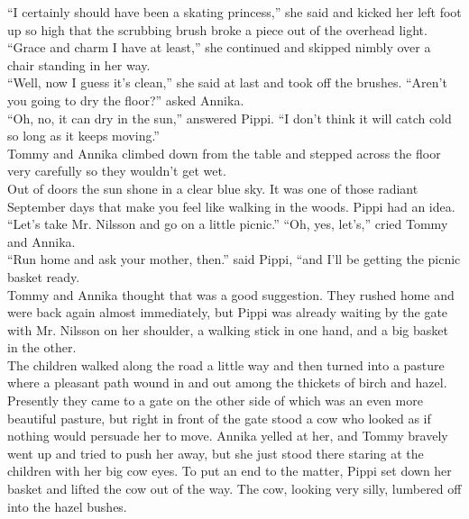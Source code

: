 \documentclass{standard}
\begin{document}
“I certainly should have been a skating princess,” she said and kicked her left foot up so high that the scrubbing brush broke a piece out of the overhead light.\\

“Grace and charm I have at least,” she continued and skipped nimbly over a chair standing in her way.\\

“Well, now I guess it’s clean,” she said at last and took off the brushes. “Aren’t you going to dry the floor?” asked Annika.\\

“Oh, no, it can dry in the sun,” answered Pippi. “I don’t think it will catch cold so long as it keeps moving.”\\

Tommy and Annika climbed down from the table and stepped across the floor very carefully so they wouldn’t get wet.\\

Out of doors the sun shone in a clear blue sky. It was one of those radiant September days that make you feel like walking in the woods. Pippi had an idea.\\

“Let’s take Mr. Nilsson and go on a little picnic.” “Oh, yes, let’s,” cried Tommy and Annika.\\

“Run home and ask your mother, then.” said Pippi, “and I’ll be getting the picnic basket ready.\\

Tommy and Annika thought that was a good suggestion. They rushed home and were back again almost immediately, but Pippi was already waiting by the gate with Mr. Nilsson on her shoulder, a walking stick in one hand, and a big basket in the other.\\

The children walked along the road a little way and then turned into a pasture where a pleasant path wound in and out among the thickets of birch and hazel. Presently they came to a gate on the other side of which was an even more beautiful pasture, but right in front of the gate stood a cow who looked as if nothing would persuade her to move. Annika yelled at her, and Tommy bravely went up and tried to push her away, but she just stood there staring at the children with her big cow eyes. To put an end to the matter, Pippi set down her basket and lifted the cow out of the way. The cow, looking very silly, lumbered off into the hazel bushes.\\
\end{document}
